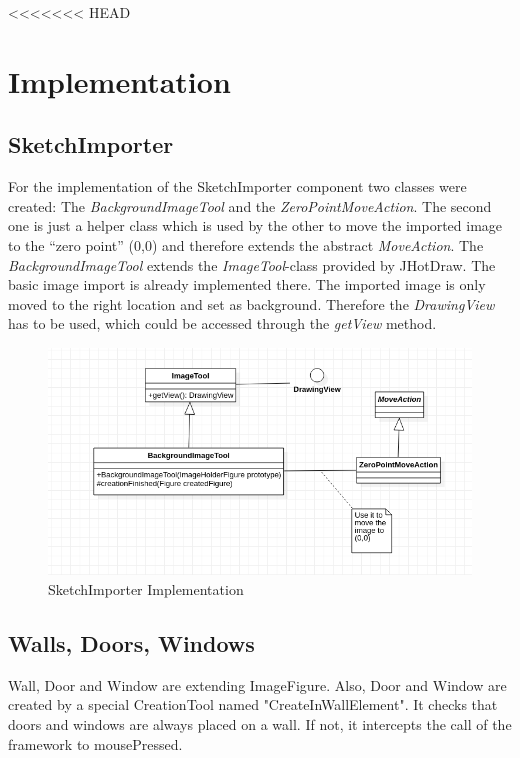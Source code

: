 <<<<<<< HEAD
\section{Implementation}

\subsection{SketchImporter}

For the implementation of the SketchImporter component two classes were created: The \textit{BackgroundImageTool} and the \textit{ZeroPointMoveAction}. The second one is just a helper class which is used by the other to move the imported image to the "`zero point"' (0,0) and therefore extends the abstract \textit{MoveAction}.
The \textit{BackgroundImageTool} extends the \textit{ImageTool}-class provided by JHotDraw. The basic image import is already implemented there. The imported image is only moved to the right location and set as background. Therefore the \textit{DrawingView} has to be used, which could be accessed through the \textit{getView} method.

\begin{figure}[h]
    \includegraphics[keepaspectratio,width=\textwidth]{images/SketchImporter.png}
    \caption{SketchImporter Implementation}
\end{figure}

\subsection{Walls, Doors, Windows}

Wall, Door and Window are extending ImageFigure.
Also, Door and Window are created by a special CreationTool named "CreateInWallElement".
It checks that doors and windows are always placed on a wall.
If not, it intercepts the call of the framework to mousePressed.

